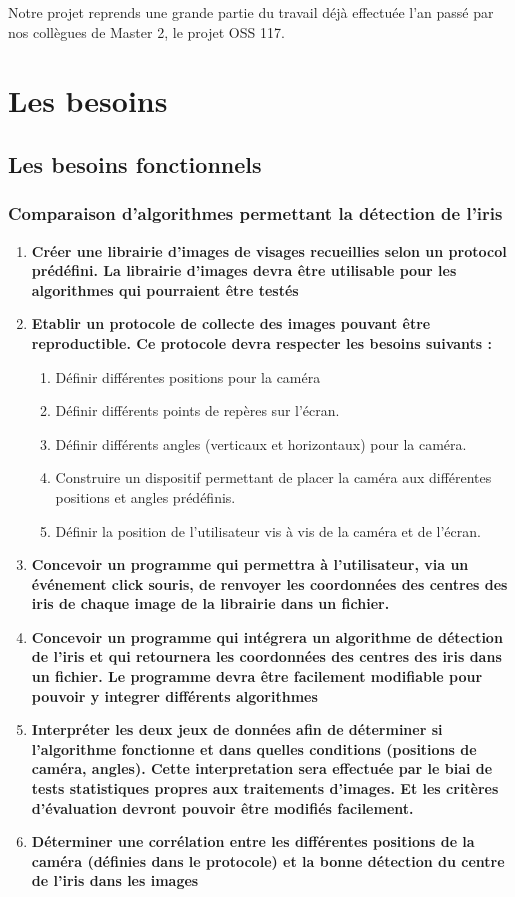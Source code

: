 \documentclass[a4paper, 12pt]{report}
\begin{document}
Notre projet reprends une grande partie du travail déjà effectuée l'an passé par nos collègues de Master 2, le projet OSS 117\cite{c7}.


    \chapter{Les besoins}
		\section{Les besoins fonctionnels}
        \subsection{Comparaison d'algorithmes permettant la détection de l'iris}
\begin{enumerate}
\item \textbf{Créer une librairie d'images de visages recueillies selon un protocol prédéfini. La librairie d'images devra être utilisable pour les algorithmes qui pourraient être testés}
\item \textbf{Etablir un protocole de collecte des images pouvant être reproductible. Ce protocole devra respecter les besoins suivants :}
\begin{enumerate}
\item Définir différentes positions pour la caméra
\item Définir différents points de repères sur l'écran.
\item Définir différents angles (verticaux et horizontaux) pour la caméra.
\item Construire un dispositif permettant de placer la caméra aux différentes positions et angles prédéfinis.
\item Définir la position de l'utilisateur vis à vis de la caméra et de l'écran.
\end{enumerate}
\item \textbf{Concevoir un programme qui permettra à l'utilisateur, via un événement click souris, de renvoyer les coordonnées des centres des iris de chaque image de la librairie dans un fichier.}
\item \textbf{Concevoir un programme qui intégrera un algorithme de détection de l'iris et qui retournera les coordonnées des centres des iris dans un fichier. Le programme devra être facilement modifiable pour pouvoir y integrer différents algorithmes}
\item \textbf{Interpréter les deux jeux de données afin de déterminer si l’algorithme fonctionne et dans quelles conditions (positions de caméra, angles). Cette interpretation sera effectuée par le biai de tests statistiques propres aux traitements d'images. Et les critères d'évaluation devront pouvoir être modifiés facilement.}
\item \textbf{Déterminer une corrélation entre les différentes positions de la caméra (définies dans le protocole) et la bonne détection du centre de l’iris dans les images}
\end{enumerate}
\end{document}
